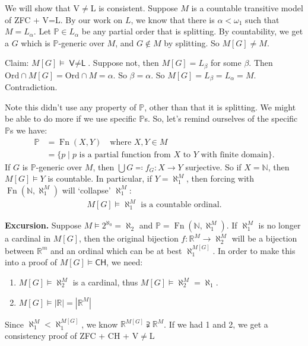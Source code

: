 \documentclass{article}
\newcommand{\p}{\mathbb{P}}
\newcommand{\1}{\mathbbm{1}}
\let\models\vDash
\begin{document}
\newlec
We will show that \textsf{V$\neq$L} is consistent.
Suppose $M$ is a countable transitive model of \textsf{ZFC} + \textsf{V=L}.
By our work on $L$, we know that there is $\alpha < \omega_1$ such that $M = L_\alpha$.
Let $\mathbb{P} \in L_\alpha$ be any partial order that is splitting.
By countability, we get a $G$ which is $\p$-generic over $M$, and $G \notin M$ by splitting.
So $M[G] \neq M$.

Claim: $M[G] \models \textsf{V$\neq$L}$. Suppose not, then $M[G] = L_\beta$ for some $\beta$. Then $\text{Ord} \cap M[G] = \text{Ord} \cap M = \alpha$.
So $\beta = \alpha$. So $M[G] = L_\beta = L_\alpha = M$. Contradiction.

Note this didn't use any property of $\p$, other than that it is splitting.
We might be able to do more if we use specific $\p$s.
So, let's remind ourselves of the specific $\p$s we have:
\begin{align*}
  \p &= \operatorname{Fn}(X,Y) \quad \text{where } X,Y \in M \\
     &= \{ p \mid p \text{ is a partial function from } X \text{ to } Y \text{ with finite domain}\}.
\end{align*}
If $G$ is $\mathbb{P}$-generic over $M$, then $\bigcup G \eqqcolon f_G: X \to Y$ surjective.
So if $X = \mathbb{N}$, then $M[G] \models Y$ is countable.
In particular, if $Y = \aleph_1^M$, then forcing with $\operatorname{Fn}(\mathbb{N},\aleph_1^M)$ will `collapse' $\aleph_1^M$:
\begin{align*}
  M[G] \models \aleph_1^M \text{ is a countable ordinal.}
\end{align*}

\textbf{Excursion.} Suppose $M \models 2^{\aleph_0} = \aleph_2$ and $\mathbb{P} = \operatorname{Fn}(\mathbb{N},\aleph_1^M)$.
If $\aleph_1^M$ is no longer a cardinal in $M[G]$, then the original bijection $f: \mathbb{R}^M \to \aleph_2^M$ will be a bijection between $\mathbb{R}^m$ and an ordinal which can be at best $\aleph_1^{M[G]}$.
In order to make this into a proof of $M[G] \models \textsf{CH}$, we need:
\begin{enumerate}
  \item $M[G] \models \aleph_2^M$ is a cardinal, thus $M[G] \models \aleph_2^M = \aleph_1$.
  \item $M[G] \models |\mathbb{R}| = |\mathbb{R}^M|$
\end{enumerate}
Since $\aleph_1^M < \aleph_1^{M[G]}$, we know $\mathbb{R}^{M[G]} \supsetneqq \mathbb{R}^M$.
If we had 1 and 2, we get a consistency proof of \textsf{ZFC} + \textsf{CH} + \textsf{V$\neq$L}
\end{document}
